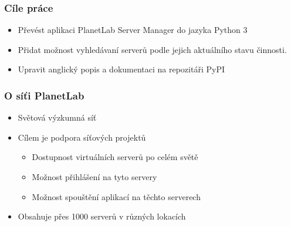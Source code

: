 \documentclass[%
  12pt,       				%
	t,                  %
	aspectratio=1610,   %
	unicode,						%
]{beamer}				    	%
\begin{document}
\vypninavigacnisymboly

\vytvortitulku

\begin{frame} 
	\frametitle{Cíle práce}
	\begin{itemize}
		\item Převést aplikaci PlanetLab Server Manager do jazyka Python 3
		\item Přidat možnost vyhledávaní serverů podle jejich aktuálního stavu činnosti.
		\item Upravit anglický popis a dokumentaci na repozitáři PyPI 
	\end{itemize}
\end{frame}

\begin{frame} 
	\frametitle{O síťi PlanetLab}
\begin{itemize}
	\item Světová výzkumná síť
	\item Cílem je podpora síťových projektů
		\begin{itemize}
			\item Dostupnost virtuálních serverů po celém světě
			\item Možnost přihlášení na tyto servery
			\item Možnost spouštění aplikací na těchto serverech
		\end{itemize}
	\item Obsahuje přes 1000 serverů v různých lokacích
\end{itemize}
\begin{figure}[H]
	\centering
\end{figure}
\end{frame} 
\end{document}
